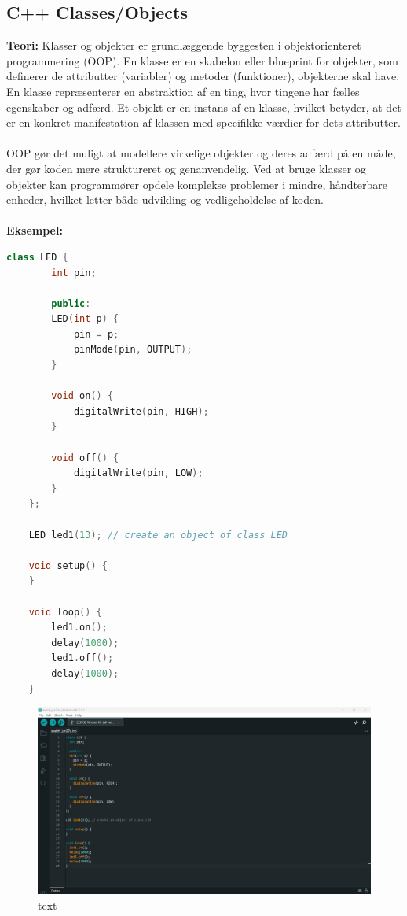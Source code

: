 \subsection{C++ Classes/Objects}
\textbf{Teori:} Klasser og objekter er grundlæggende byggesten i objektorienteret programmering (OOP). En klasse er en skabelon eller blueprint for objekter, som definerer de attributter (variabler) og metoder (funktioner), objekterne skal have. En klasse repræsenterer en abstraktion af en ting, hvor tingene har fælles egenskaber og adfærd. Et objekt er en instans af en klasse, hvilket betyder, at det er en konkret manifestation af klassen med specifikke værdier for dets attributter.
\\\\
\noindent OOP gør det muligt at modellere virkelige objekter og deres adfærd på en måde, der gør koden mere struktureret og genanvendelig. Ved at bruge klasser og objekter kan programmører opdele komplekse problemer i mindre, håndterbare enheder, hvilket letter både udvikling og vedligeholdelse af koden.
\\\\
\noindent\noindent\textbf{Eksempel:}
\begin{lstlisting}[language=C++]
	class LED {
		int pin;
		
		public:
		LED(int p) {
			pin = p;
			pinMode(pin, OUTPUT);
		}
		
		void on() {
			digitalWrite(pin, HIGH);
		}
		
		void off() {
			digitalWrite(pin, LOW);
		}
	};
	
	LED led1(13); // create an object of class LED
	
	void setup() {
	}
	
	void loop() {
		led1.on();
		delay(1000);
		led1.off();
		delay(1000);
	}
\end{lstlisting}
\begin{figure}[h!]
	\centering
	\includegraphics[width=\textwidth]{fig/fig13.png}
	\caption{text}
	\label{fig:13}
\end{figure}

